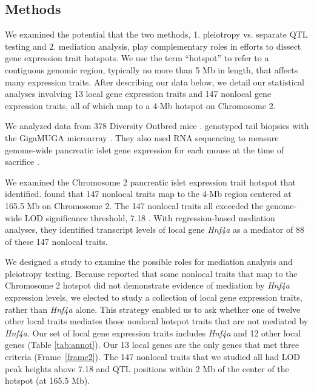 \documentclass[oneside]{book}\usepackage[]{graphicx}\usepackage[]{color}
\begin{document}
\subsection{Methods}

We examined the potential that the two methods, 1. pleiotropy vs. separate QTL testing and 
2. mediation analysis, play complementary roles in efforts to dissect gene expression trait hotspots. 
We use the term ``hotspot'' to refer to a contiguous genomic region, 
typically no more than 5 Mb in length, that affects many expression traits.
After describing our data below, we detail our statistical analyses involving 13 local 
gene expression traits and 147 nonlocal gene expression traits, 
all of which map to a 4-Mb hotspot on Chromosome 2.


We analyzed data from 378 Diversity Outbred mice \citep{keller2018genetic}. 
\citet{keller2018genetic} genotyped tail biopsies with the GigaMUGA microarray \citep{morgan2015mouse}. 
They also used RNA sequencing to measure genome-wide pancreatic islet gene expression 
for each mouse at the time of sacrifice \citep{keller2018genetic}. 

We examined the Chromosome 2 pancreatic islet expression trait hotspot that \citet{keller2018genetic} identified. 
\citet{keller2018genetic} found that 147 nonlocal traits map to the 4-Mb region 
centered at 165.5 Mb on Chromosome 2.
The 147 nonlocal traits all exceeded the genome-wide LOD significance threshold, 
7.18 \citep{keller2018genetic}. 
With regression-based mediation analyses, they identified transcript levels of local gene \emph{Hnf4a} as a mediator of 88 of these 147 nonlocal traits.

We designed a study to examine the possible roles for mediation analysis and pleiotropy testing. 
Because \citet{keller2018genetic} reported that some nonlocal traits that map to 
the Chromosome 2 hotspot did not demonstrate evidence of mediation by \emph{Hnf4a} expression
levels, we elected to study a collection of local gene expression traits, 
rather than \emph{Hnf4a} alone.
This strategy enabled us to ask whether one of twelve other local traits mediates those 
nonlocal hotspot traits that are not mediated by \emph{Hnf4a}. 
Our set of local gene expression traits includes \emph{Hnf4a} and 12 
other local genes (Table \ref{tab:annot}). 
Our 13 local genes are the only genes that met three criteria (Frame~\ref{frame2}).
The 147 nonlocal traits that we studied all had LOD peak heights above 7.18 and QTL positions within 2 Mb of the center of the hotspot (at 165.5 Mb).
\end{document}
